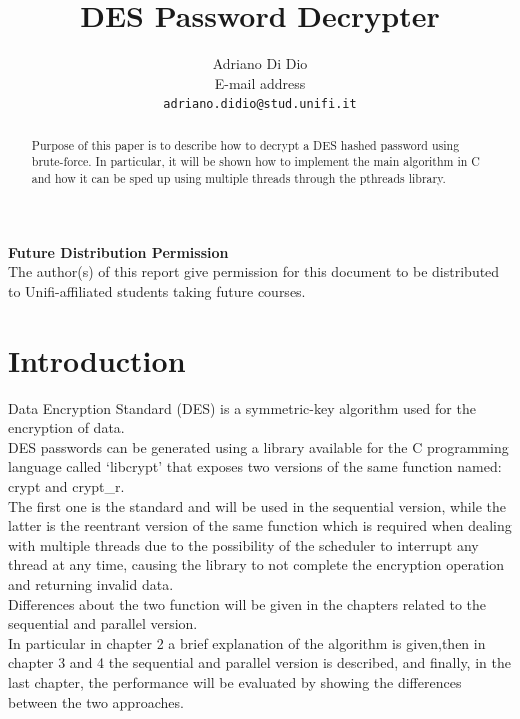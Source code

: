 \documentclass[10pt,twocolumn,letterpaper]{article}
\begin{document}
\title{DES Password Decrypter}

\author{Adriano Di Dio\\
E-mail address\\
{\tt\small adriano.didio@stud.unifi.it}
}

\maketitle
\thispagestyle{empty}

\begin{abstract}
Purpose of this paper is to describe how to decrypt a DES hashed password using brute-force.\newline
In particular, it will be shown how to implement the main algorithm in C and how it can be sped up using multiple threads through the 
pthreads library.
\end{abstract}

\noindent\large\textbf{Future Distribution Permission}\\
\indent The author(s) of this report give permission for this document to be distributed to Unifi-affiliated students taking future courses.

\section{Introduction}
Data Encryption Standard (DES) is a symmetric-key algorithm used for the encryption of data.\\
DES passwords can be generated using a library available for the C programming language called `libcrypt' that exposes two versions of 
the same function named: crypt and crypt\_r.\\
The first one is the standard and will be used in the sequential version, while the latter is the reentrant version of the same function 
which is required when dealing with multiple threads due to the possibility of the scheduler to interrupt any thread at any time, 
causing the library to not complete the encryption operation and returning invalid data.\\
Differences about the two function will be given in the chapters related to the sequential and parallel version.\\
In particular in chapter 2 a brief explanation of the algorithm is given,then in chapter 3 and 4 the sequential and parallel version is 
described, and finally, in the last chapter, the performance will be evaluated by showing the differences between the two approaches.\\ 
\end{document}
